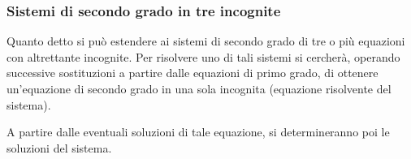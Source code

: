 
\subsubsection{Sistemi di secondo grado in tre incognite}
Quanto detto si può estendere ai sistemi di secondo grado di tre o più equazioni 
con altrettante incognite. Per risolvere uno di tali sistemi si cercherà, 
operando successive sostituzioni a partire dalle equazioni di primo grado, di 
ottenere un'equazione di secondo grado in una sola incognita (equazione 
risolvente del sistema).

A partire dalle eventuali soluzioni di tale equazione, si determineranno poi le 
soluzioni del sistema.

\newpage

